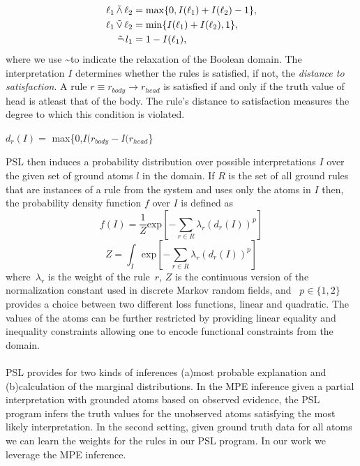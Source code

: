 \begin{align*}
\ell_1 \softand \ell_2 &= \max\{0, I(\ell_1) + I(\ell_2) - 1\},\\
\ell_1 \softor \ell_2 &= \min\{I(\ell_1) + I(\ell_2), 1\},\\
\softneg l_1 &= 1 - I(\ell_1),
\end{align*}  
where we use \textasciitilde to indicate the relaxation of the Boolean domain.
The interpretation $\mathit{I}$ determines whether the rules is satisfied, if not, the \emph{distance to satisfaction}.
A rule $\mathit{r} \equiv \mathit{r_{body}} \rightarrow \mathit{r_{head}} $  is satisfied if and only if the truth value of head is atleast that of the body. The rule's distance to satisfaction measures the degree to which this condition is violated.
 \newline
\begin{center} 
 $\mathit{d_r}(\mathit{I}) =$ max\{0,$\mathit{I(r_{body}} - \mathit{I(r_{head}}$\}
 \end{center}

PSL then induces a probability distribution over possible interpretations $\mathit{I}$ over the given set of ground atoms $\mathit{l} $ in the domain. 
If $\mathit{R}$ is the set of all ground rules that are instances of a rule from the system and uses only the atoms in  $\mathit{I}$ then,
the probability density function $\mathit{f}$ over $\mathit{I}$ is defined as
\begin{equation}
\label{eq:contimn1}
    f (I) = \frac{1}{Z} \text{exp}[-\sum_{r\in R} \lambda_r (d_r(I))^p]
\end{equation}
\begin{equation}
\label{eq:contimn2}
	Z = \int_{I} \text{exp} [ -\sum_{r\in R} \lambda_r (d_r(I))^p ]
\end{equation}
where~$\lambda_r$ is the weight of the rule~$r$, $Z$ is the continuous version of the normalization constant used in discrete Markov random fields, and ~$p \in \{1, 2\}$ provides a choice between two different loss functions, linear and quadratic.
The values of the atoms can be further restricted by providing linear equality and inequality constraints allowing one to encode functional constraints from the domain.
\paragraph{}
PSL provides for two kinds of inferences (a)most probable explanation and (b)calculation of the marginal distributions. 
In the MPE inference given a partial interpretation with grounded atoms based on observed evidence, the PSL program infers the truth values for the unobserved atoms satisfying the most likely interpretation. 
In the second setting, given ground truth data for all atoms we can learn the weights for the rules in our PSL program.
In our work we leverage the MPE inference.
